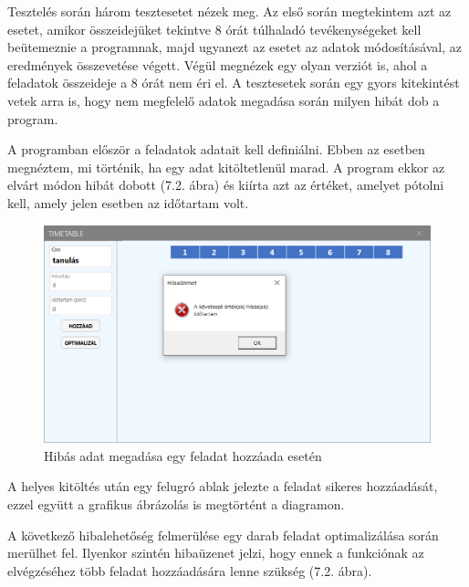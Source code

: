 
Tesztelés során három tesztesetet nézek meg. Az első során megtekintem azt az esetet, amikor összeidejüket tekintve 8 órát túlhaladó tevékenységeket kell beütemeznie a programnak, majd ugyanezt az esetet az adatok módosításával, az eredmények összevetése végett. Végül megnézek egy olyan verziót is, ahol a feladatok összeideje a 8 órát nem éri el. A tesztesetek során egy gyors kitekintést vetek arra is, hogy nem megfelelő adatok megadása során milyen hibát dob a program.


A programban először a feladatok adatait kell definiálni. Ebben az esetben megnéztem, mi történik, ha egy adat kitöltetlenül marad. A program ekkor az elvárt módon hibát dobott (7.2. ábra) és kiírta azt az értéket, amelyet pótolni kell, amely jelen esetben az időtartam volt.

\begin{figure}[h]
	\centering
	\includegraphics[scale=0.6]{images/test/durationFault.png}
	\caption{Hibás adat megadása egy feladat hozzáada esetén}
\end{figure}

A helyes kitöltés után egy felugró ablak jelezte a feladat sikeres hozzáadását, ezzel együtt a grafikus ábrázolás is megtörtént a diagramon.

A következő hibalehetőség felmerülése egy darab feladat optimalizálása során merülhet fel. Ilyenkor szintén hibaüzenet jelzi, hogy ennek a funkciónak az elvégzéséhez több feladat hozzáadására lenne szükség (7.2. ábra).

